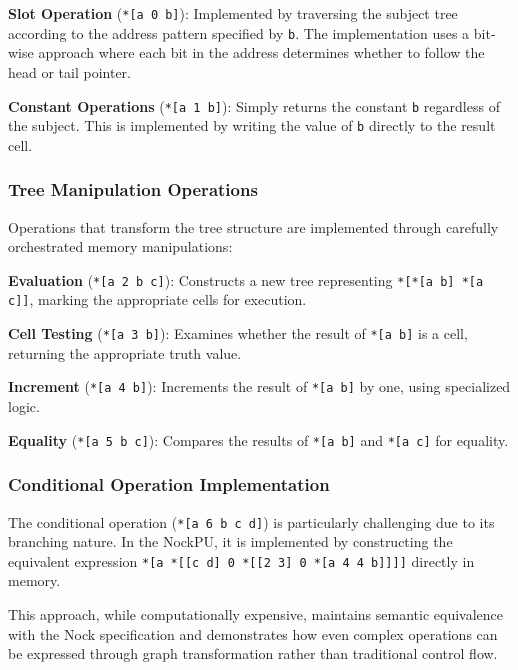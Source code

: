 \documentclass[twoside]{article}
\begin{document}
\textbf{Slot Operation} (\texttt{*[a 0 b]}): Implemented by traversing the subject tree according to the address pattern specified by \texttt{b}. The implementation uses a bit-wise approach where each bit in the address determines whether to follow the head or tail pointer.

\textbf{Constant Operations} (\texttt{*[a 1 b]}): Simply returns the constant \texttt{b} regardless of the subject. This is implemented by writing the value of \texttt{b} directly to the result cell.

\subsubsection{Tree Manipulation Operations}

Operations that transform the tree structure are implemented through carefully orchestrated memory manipulations:

\textbf{Evaluation} (\texttt{*[a 2 b c]}): Constructs a new tree representing \texttt{*[*[a b] *[a c]]}, marking the appropriate cells for execution.


\textbf{Cell Testing} (\texttt{*[a 3 b]}): Examines whether the result of \texttt{*[a b]} is a cell, returning the appropriate truth value.

\textbf{Increment} (\texttt{*[a 4 b]}): Increments the result of \texttt{*[a b]} by one, using specialized logic.

\textbf{Equality} (\texttt{*[a 5 b c]}): Compares the results of \texttt{*[a b]} and \texttt{*[a c]} for equality.

\subsubsection{Conditional Operation Implementation}

The conditional operation (\texttt{*[a 6 b c d]}) is particularly challenging due to its branching nature. In the NockPU, it is implemented by constructing the equivalent expression \texttt{*[a *[[c d] 0 *[[2 3] 0 *[a 4 4 b]]]]} directly in memory.

This approach, while computationally expensive, maintains semantic equivalence with the Nock specification and demonstrates how even complex operations can be expressed through graph transformation rather than traditional control flow.
\end{document}
